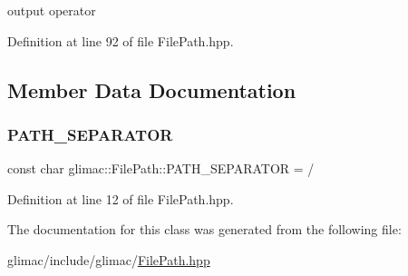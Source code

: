 output operator 

Definition at line 92 of file File\+Path.\+hpp.



\subsection{Member Data Documentation}
\mbox{\label{classglimac_1_1_file_path_a011d614268133b82be0d0596e15a4648}} 
\subsubsection{\texorpdfstring{P\+A\+T\+H\+\_\+\+S\+E\+P\+A\+R\+A\+T\+OR}{PATH\_SEPARATOR}}
{\footnotesize\ttfamily const char glimac\+::\+File\+Path\+::\+P\+A\+T\+H\+\_\+\+S\+E\+P\+A\+R\+A\+T\+OR = \textquotesingle{}/\textquotesingle{}\hspace{0.3cm}{\ttfamily [static]}}



Definition at line 12 of file File\+Path.\+hpp.



The documentation for this class was generated from the following file\+:\begin{DoxyCompactItemize}
\item 
glimac/include/glimac/\hyperlink{_file_path_8hpp}{File\+Path.\+hpp}\end{DoxyCompactItemize}
